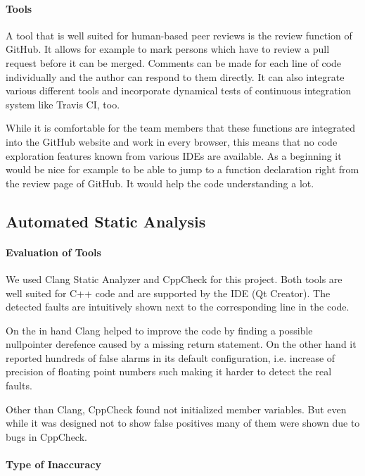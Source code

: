\documentclass{scrartcl}
\begin{document}
\paragraph{Tools}

A tool that is well suited for human-based peer reviews is the review function of GitHub. It allows for example to mark persons which have to review a pull request before it can be merged. Comments can be made for each line of code individually and the author can respond to them directly. It can also integrate various different tools and incorporate dynamical tests of continuous integration system like Travis CI, too.

While it is comfortable for the team members that these functions are integrated into the GitHub website and work in every browser, this means that no code exploration features known from various IDEs are available. As a beginning it would be nice for example to be able to jump to a function declaration right from the review page of GitHub. It would help the code understanding a lot.

\subsection{Automated Static Analysis}

\paragraph{Evaluation of Tools}

We used Clang Static Analyzer and CppCheck for this project.
Both tools are well suited for C++ code and are supported by the IDE (Qt Creator). The detected faults are intuitively shown next to the corresponding line in the code.

On the in hand Clang helped to improve the code by finding a possible nullpointer derefence caused by a missing return statement. On the other hand it reported hundreds of false alarms in its default configuration, i.e. increase of precision of floating point numbers such making it harder to detect the real faults.

Other than Clang, CppCheck found not initialized member variables. But even while it was designed not to show false positives many of them were shown due to bugs in CppCheck.

\paragraph{Type of Inaccuracy}
\end{document}
